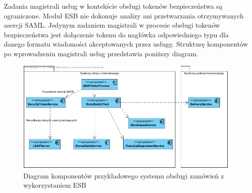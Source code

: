 		Zadania magistrali usług w kontekście obsługi tokenów bezpieczeństwa są ograniczone. Moduł ESB nie dokonuje analizy ani przetwarzania otrzymywanych asercji SAML. Jedynym zadaniem magistrali w procesie obsługi tokenów bezpieczeństwa jest dołączenie tokenu do nagłówka odpowiedniego typu dla danego formatu wiadomości akceptowanych przez usługę.
		Strukturę komponentów po wprowadzeniu magistrali usług przedstawia poniższy diagram.

		\begin{figure}[h]
			\centering
			\includegraphics[width=\textwidth]{img/KomponentySystemuESB.png}
			\caption{Diagram komponentów przykładowego systemu obsługi zamówień z wykorzystaniem ESB}
			\label{KomponentyESB}
		\end{figure}
		
